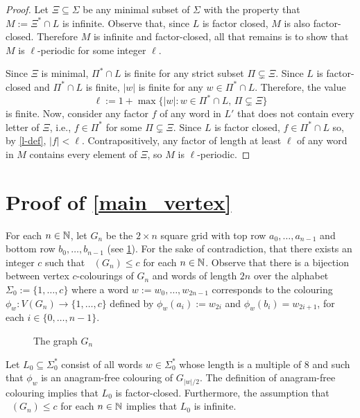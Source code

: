 \documentclass{patmorin}
\DeclareMathOperator{\afcn}{\dot{\chi}_\pi}
\begin{document}
\begin{proof}
    Let $\Xi\subseteq\Sigma$ be any minimal subset of $\Sigma$ with the property that $M:=\Xi^* \cap L$ is infinite.  Observe that, since $L$ is factor closed, $M$ is also factor-closed.  Therefore $M$ is infinite and factor-closed, all that remains is to show that $M$ is $\ell$-periodic for some integer $\ell$.

    Since $\Xi$ is minimal, $\Pi^*\cap L$ is finite for any strict subset $\Pi\subsetneq \Xi$.  Since $L$ is factor-closed and $\Pi^*\cap L$ is finite, $|w|$ is finite for any $w\in\Pi^*\cap L$.
    Therefore, the value
    \begin{equation}
        \ell:=1+\max\{|w|: w\in \Pi^*\cap L,\, \Pi\subsetneq\Xi\} \label{l-def}
    \end{equation}
    is finite.  Now, consider any factor $f$ of any word in $L'$ that does not contain every letter of $\Xi$, i.e., $f\in\Pi^*$ for some  $\Pi\subsetneq\Xi$.  Since $L$ is factor closed, $f\in \Pi^*\cap L$ so, by \cref{l-def}, $|f| < \ell$.  Contrapositively, any factor of length at least $\ell$ of any word in $M$ contains every element of $\Xi$, so $M$ is $\ell$-periodic.
\end{proof}


\section{Proof of \cref{main_vertex}}
\label{vertex_colourings}

For each $n\in\mathbb{N}$, let $G_n$ be the $2\times n$ square grid with top row $a_0,\ldots,a_{n-1}$ and bottom row $b_0,\ldots,b_{n-1}$ (see \cref{g_n}).  For the sake of contradiction, that there exists an integer $c$ such that $\afcn(G_n)\le c$ for each $n\in\mathbb{N}$.  Observe that there is a bijection between vertex $c$-colourings of $G_n$ and words of length $2n$ over the alphabet $\Sigma_0:=\{1,\ldots,c\}$ where a word $w:=w_0,\ldots,w_{2n-1}$ corresponds to the colouring $\phi_w:V(G_n)\to\{1,\ldots,c\}$ defined by
$\phi_w(a_i):=w_{2i}$ and $\phi_w(b_i)=w_{2i+1}$, for each $i\in\{0,\ldots,n-1\}$.

\begin{figure}
    \caption{The graph $G_n$}
    \label{g_n}
\end{figure}


Let $L_0\subseteq \Sigma_0^*$ consist of all words $w\in \Sigma_0^*$ whose length is a multiple of $8$ and such that $\phi_w$ is an anagram-free colouring of $G_{|w|/2}$.  The definition of anagram-free colouring implies that $L_0$ is factor-closed.  Furthermore, the assumption that $\afcn(G_n)\le c$ for each $n\in\mathbb{N}$ implies that $L_0$ is infinite.
\end{document}
